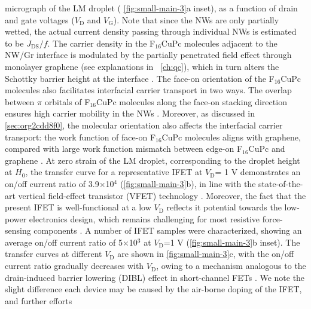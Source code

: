 micrograph of the LM droplet ( \autoref{fig:small-main-3}a inset), as
a function of drain and gate voltages (\(V_{\mathrm{D}}\) and
\(V_{\mathrm{G}}\)). Note that since the NWs are only partially
wetted, the actual current density passing through individual NWs is
estimated to be \(J_{\mathrm{DS}}/f\). The carrier density in the
F\(_{\text{16}}\)CuPc molecules adjacent to the NW/Gr interface is
modulated by the partially penetrated field effect through monolayer
graphene (see explanations in ~\autoref{ch:qc}), which in turn alters
the Schottky barrier height at the interface
\autocite{Yang_2012_Barristor}.
%
The face-on orientation of the F\(_{\text{16}}\)CuPc molecules also
facilitates interfacial carrier transport in two ways. The overlap
between \(\pi\) orbitals of F\(_{\text{16}}\)CuPc molecules along the
face-on stacking direction ensures high carrier mobility in the NWs
\autocite{Bao_1998_FCuPC}.
%
Moreover, as discussed in \autoref{sec:org2cdd8f0}, the molecular
orientation also affects the interfacial carrier transport: the work
function of face-on F\(_{\text{16}}\)CuPc molecules aligns with
graphene, compared with large work function mismatch between edge-on
F\(_{\text{16}}\)CuPc and graphene
\autocite{Mao_2010_F16_level_orien,Ren_2011_DFT_CuPc_epi_gr}.
%
At zero strain of the LM droplet,  corresponding to the droplet height at \(H_{0}\),
the transfer curve for a representative IFET at \(V_{\mathrm{D}}\)= 1
V demonstrates an on/off current ratio of
3.9\(\times\)10\(^{\text{4}}\) (\autoref{fig:small-main-3}b), in line
with the state-of-the-art vertical field-effect transistor (VFET)
technology
\autocite{Yang_2012_Barristor,Shih_2015_PartiallyScreened,Sun_2017_COF_VFET,Ben_Sasson_2014_fet_rev}.
%
Moreover,
the fact that the present IFET is well-functional at a low
\(V_{\mathrm{D}}\) reflects it potential towards the low-power
electronics design, which remains challenging for most resistive
force-sensing components \autocite{Pan_2014_pressure,Pang_2012_gauge}. A
number of IFET samples were characterized, showing an average on/off
current ratio of 5\(\times\)10\(^{\text{3}}\) at \(V_{\mathrm{D}}\)=1
V (\autoref{fig:small-main-3}b inset). The transfer curves at
different \(V_{\mathrm{D}}\) are shown in \autoref{fig:small-main-3}c,
with the on/off current ratio gradually decreases with
\(V_{\mathrm{D}}\), owing to a mechanism analogous to the
drain-induced barrier lowering (DIBL) effect in short-channel FETs
\autocite{Lundstrom_2003_moore}. We note the slight difference each device
may be caused by the air-borne doping of the IFET, and further efforts
